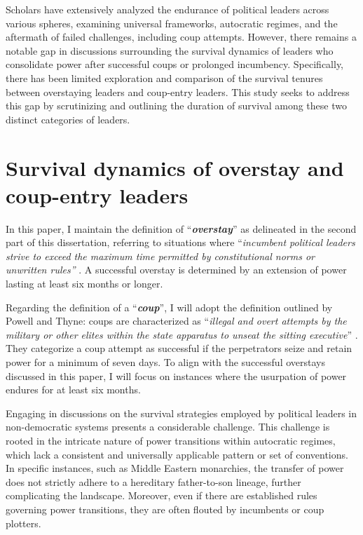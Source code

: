 \documentclass[
  12pt,
  a4paper,
  12pt]{article}
\begin{document}
Scholars have extensively analyzed the endurance of political leaders
across various spheres, examining universal frameworks, autocratic
regimes, and the aftermath of failed challenges, including coup
attempts. However, there remains a notable gap in discussions
surrounding the survival dynamics of leaders who consolidate power after
successful coups or prolonged incumbency. Specifically, there has been
limited exploration and comparison of the survival tenures between
overstaying leaders and coup-entry leaders. This study seeks to address
this gap by scrutinizing and outlining the duration of survival among
these two distinct categories of leaders.

\newpage

\section{Survival dynamics of overstay and coup-entry
leaders}\label{survival-dynamics-of-overstay-and-coup-entry-leaders}

In this paper, I maintain the definition of ``\textbf{\emph{overstay}}''
as delineated in the second part of this dissertation, referring to
situations where ``\emph{incumbent political leaders strive to exceed
the maximum time permitted by constitutional norms or unwritten rules''}
\citep[p5]{zhu2024}. A successful overstay is determined by an extension
of power lasting at least six months or longer.

Regarding the definition of a ``\textbf{\emph{coup}}'', I will adopt the
definition outlined by Powell and Thyne: coups are characterized as
``\emph{illegal and overt attempts by the military or other elites
within the state apparatus to unseat the sitting executive}''
\citep[p252]{powell2011}. They categorize a coup attempt as successful
if the perpetrators seize and retain power for a minimum of seven days.
To align with the successful overstays discussed in this paper, I will
focus on instances where the usurpation of power endures for at least
six months.

Engaging in discussions on the survival strategies employed by political
leaders in non-democratic systems presents a considerable challenge.
This challenge is rooted in the intricate nature of power transitions
within autocratic regimes, which lack a consistent and universally
applicable pattern or set of conventions. In specific instances, such as
Middle Eastern monarchies, the transfer of power does not strictly
adhere to a hereditary father-to-son lineage, further complicating the
landscape. Moreover, even if there are established rules governing power
transitions, they are often flouted by incumbents or coup plotters.
\end{document}

